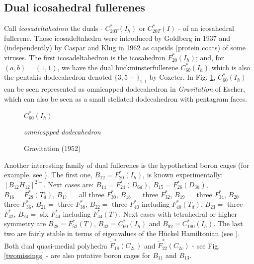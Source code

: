 \subsection{Dual icosahedral fullerenes}
Call {\em icosadeltahedron} the duals - $C^*_{20T}(I_h)$ or $C^*_{20T}(I)$ - of an
icosahedral fullerene. Those icosadeltahedra were introduced by {\sc Goldberg} \cite{g37} in 1937
and (independently) by {\sc Caspar and Klug} \cite{ck62} in 1962 as capsids
(protein coats) of some viruses. The first icosadeltahedron is the icosahedron
$F^*_{20}(I_h)$; and, for $(a,b)=(1,1)$, we have the dual buckminsterfullerene $C^*_{60}(I_h)$
which is also the pentakis dodecahedron denoted $\{3,5+\}_{1,1}$ by {\sc Coxeter}.
In Fig. \ref{escher}, $C^*_{60}(I_h)$ can be seen represented as omnicapped dodecahedron
in {\em Gravitation} of {\sc Escher}, which can also be seen as a small stellated 
dodecahedron with pentagram faces. 

\begin{figure}[hb]
\begin{center}

$C^*_{60}(I_h)$
\end{center}
\begin{center}
\caption{{\sc Gravitation (1952)}}\label{escher}
{\it omnicapped dodecahedron}
\end{center}
\end{figure}

\begin{remark} 
Another interesting family of dual fullerenes is the hypothetical 
boron cages (for example, see \cite{bl77}). 
The first one, $B_{12}=F^*_{20}(I_h)$, 
is known experimentally: $[B_{12}H_{12}]^{2-}$.
Next cases are:
$B_{14}=F^*_{24}(D_{6d})$,
$B_{15}=F^*_{26}(D_{3h})$,
$B_{16}=F^*_{28}(T_d)$,
$B_{17}=$ all three $F^*_{30}$,
$B_{18}=$ three  $F^*_{32}$,
$B_{19}=$ three $F^*_{34}$,
$B_{20}=$ three $F^*_{36}$,
$B_{21}=$ three $F^*_{38}$,
$B_{22}=$ three $F^*_{40}$ including $F^*_{40}(T_d)$,
$B_{23}=$ three $F^*_{42}$,
$B_{24}=$ six $F^*_{44}$ including $F^*_{44}(T)$.
Next cases with tetrahedral or higher symmetry are 
$B_{28}=F^*_{52}(T)$, 
$B_{32}=C^*_{60}(I_h)$ and
$B_{92}=C^*_{180}(I_h)$. 
The last two are fairly stable in terms of eigenvalues of the H\"uckel 
Hamiltonian (see \cite{chin}). 
Both dual quasi-medial polyhedra $\tilde{F}^*_{18}(C_{2v})$ and $\tilde{F}^*_{22}(C_{2v})$ - see
Fig. \ref{twomissings} - are also putative boron cages for $B_{11}$
and $B_{13}$.
\end{remark}


